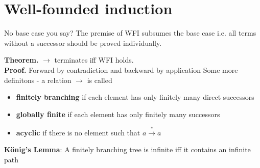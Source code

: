 \documentclass[titlepage, 12pt]{article}
\begin{document}
\section{Well-founded induction}
No base case you say? The premise of WFI subsumes the base case i.e. all terms
without a successor should be proved individually.

\textbf{Theorem.} $\rightarrow$ terminates iff WFI holds.\\
\textbf{Proof.} Forward by contradiction and backward by application
Some more definitons - a relation $\rightarrow$ is called
\begin{itemize}
    \item\textbf{finitely branching} if each element has only finitely many
        direct successors
    \item\textbf{globally finite} if each element has only finitely many
        successors
    \item\textbf{acyclic} if there is no element such that $a\xrightarrow{*}a$
\end{itemize}
\textbf{K\"onig's Lemma}: A finitely branching tree is infinite iff it contains
an infinite path
\end{document}
